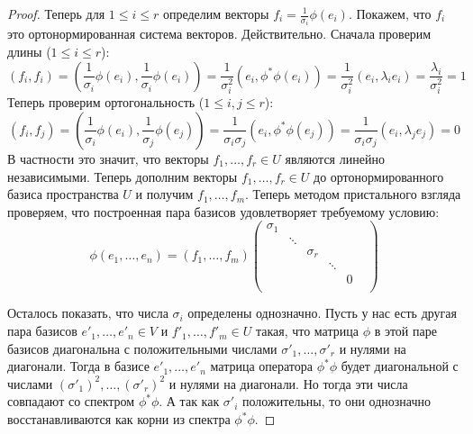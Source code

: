 \begin{proof}
Теперь для $1\leqslant i \leqslant r$ определим векторы $f_i = \frac{1}{\sigma_i}\phi(e_i)$.
Покажем, что $f_i$ это ортонормированная система векторов.
Действительно.
Сначала проверим длины ($1\leqslant i \leqslant r$):
\[
(f_i, f_i) = \left(\frac{1}{\sigma_i}\phi(e_i), \frac{1}{\sigma_i} \phi(e_i)\right) = \frac{1}{\sigma_i^2}(e_i, \phi^*\phi(e_i)) =  \frac{1}{\sigma_i^2}(e_i, \lambda_i e_i) = \frac{\lambda_i}{\sigma_i^2} = 1
\]
Теперь проверим ортогональность ($1\leqslant i, j \leqslant r$):
\[
(f_i, f_j) = \left(\frac{1}{\sigma_i}\phi(e_i), \frac{1}{\sigma_j} \phi(e_j)\right) = \frac{1}{\sigma_i\sigma_j}(e_i, \phi^*\phi(e_j)) =  \frac{1}{\sigma_i\sigma_j}(e_i, \lambda_j e_j)= 0
\]
В частности это значит, что векторы $f_1,\ldots, f_r\in U$ являются линейно независимыми.
Теперь дополним векторы $f_1,\ldots,f_r\in U$ до ортонормированного базиса пространства $U$ и получим $f_1,\ldots,f_m$.
Теперь методом пристального взгляда проверяем, что построенная пара базисов удовлетворяет требуемому условию:
\[
\phi(e_1,\ldots,e_n) = (f_1,\ldots,f_m) 
\begin{pmatrix}
{\sigma_1}&{}&{}&{}&{}&{}\\
{}&{\ddots}&{}&{}&{}&{}\\
{}&{}&{\sigma_r}&{}&{}&{}\\
{}&{}&{}&{\ddots}&{}&{}\\
{}&{}&{}&{}&{0}&{}\\
\end{pmatrix}
\]

Осталось показать, что числа $\sigma_i$ определены однозначно.
Пусть у нас есть другая пара базисов $e'_1,\ldots,e'_n\in V$ и $f'_1,\ldots,f'_m\in U$ такая, что матрица $\phi$ в этой паре базисов диагональна с положительными числами $\sigma'_1,\ldots,\sigma'_r$ и нулями на диагонали.
Тогда в базисе $e'_1,\ldots,e'_n$ матрица оператора $\phi^*\phi$ будет диагональной с числами $(\sigma'_1)^2,\ldots,(\sigma'_r)^2$ и нулями на диагонали.
Но тогда эти числа совпадают со спектром $\phi^*\phi$.
А так как $\sigma'_i$ положительны, то они однозначно восстанавливаются как корни из спектра $\phi^*\phi$.
\end{proof}
